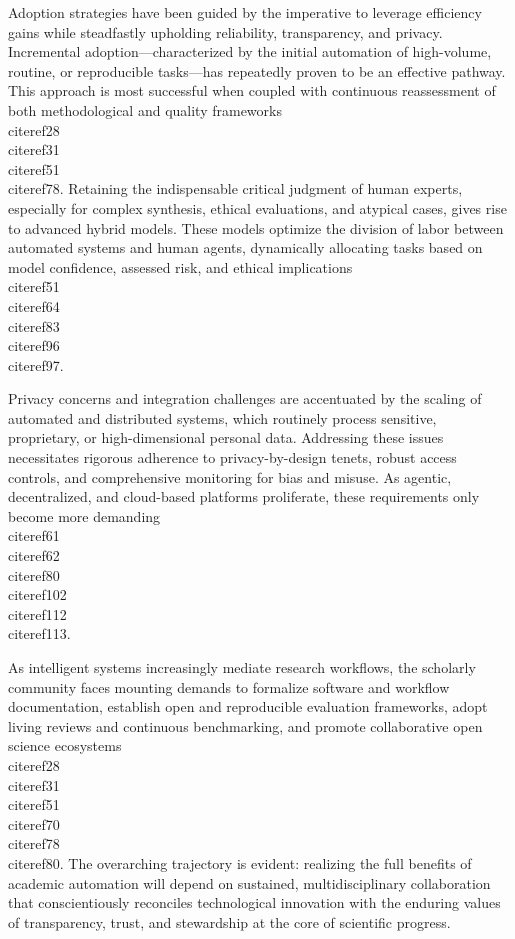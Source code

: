 \documentclass[11pt]{article}
\begin{document}
Adoption strategies have been guided by the imperative to leverage efficiency gains while steadfastly upholding reliability, transparency, and privacy. Incremental adoption—characterized by the initial automation of high-volume, routine, or reproducible tasks—has repeatedly proven to be an effective pathway. This approach is most successful when coupled with continuous reassessment of both methodological and quality frameworks \\cite{ref28}\\cite{ref31}\\cite{ref51}\\cite{ref78}. Retaining the indispensable critical judgment of human experts, especially for complex synthesis, ethical evaluations, and atypical cases, gives rise to advanced hybrid models. These models optimize the division of labor between automated systems and human agents, dynamically allocating tasks based on model confidence, assessed risk, and ethical implications \\cite{ref51}\\cite{ref64}\\cite{ref83}\\cite{ref96}\\cite{ref97}.

Privacy concerns and integration challenges are accentuated by the scaling of automated and distributed systems, which routinely process sensitive, proprietary, or high-dimensional personal data. Addressing these issues necessitates rigorous adherence to privacy-by-design tenets, robust access controls, and comprehensive monitoring for bias and misuse. As agentic, decentralized, and cloud-based platforms proliferate, these requirements only become more demanding \\cite{ref61}\\cite{ref62}\\cite{ref80}\\cite{ref102}\\cite{ref112}\\cite{ref113}.

As intelligent systems increasingly mediate research workflows, the scholarly community faces mounting demands to formalize software and workflow documentation, establish open and reproducible evaluation frameworks, adopt living reviews and continuous benchmarking, and promote collaborative open science ecosystems \\cite{ref28}\\cite{ref31}\\cite{ref51}\\cite{ref70}\\cite{ref78}\\cite{ref80}. The overarching trajectory is evident: realizing the full benefits of academic automation will depend on sustained, multidisciplinary collaboration that conscientiously reconciles technological innovation with the enduring values of transparency, trust, and stewardship at the core of scientific progress.
\end{document}
